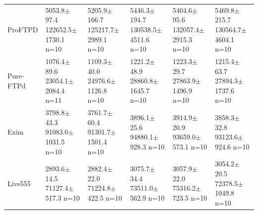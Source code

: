 \documentclass[final,5p,times,number]{elsarticle}
\begin{document}
\begin{table}[!tp]
\begin{tabularx}{\textwidth}{l *{5}{>{\centering\arraybackslash}X}}
\addlinespace[3pt]
ProFTPD & \shortstack{5053.8$\pm$97.4\\122652.5$\pm$1730.1\\n=10} & \shortstack{5205.9$\pm$166.7\\125217.7$\pm$2989.1\\n=10} & \shortstack{5446.3$\pm$194.7\\130538.5$\pm$4511.6\\n=10} & \shortstack{5404.6$\pm$95.6\\132057.4$\pm$2915.3\\n=10} & \shortstack{5469.8$\pm$215.7\\130564.7$\pm$4604.1\\n=10} \\
\addlinespace[3pt]
Pure-FTPd & \shortstack{1076.4$\pm$89.6\\23054.1$\pm$2084.4\\n=11} & \shortstack{1109.3$\pm$40.0\\24976.6$\pm$1126.8\\n=10} & \shortstack{1221.2$\pm$48.9\\28860.8$\pm$1645.7\\n=10} & \shortstack{1223.3$\pm$29.7\\27863.9$\pm$1496.9\\n=10} & \shortstack{1215.4$\pm$63.7\\27894.3$\pm$1737.6\\n=10} \\
\addlinespace[3pt]
Exim & \shortstack{3798.8$\pm$43.3\\91083.0$\pm$1031.5\\n=10} & \shortstack{3761.7$\pm$60.4\\91301.7$\pm$1501.4\\n=10} & \shortstack{3896.1$\pm$25.6\\94880.1$\pm$928.3\\n=10} & \shortstack{3914.9$\pm$20.9\\93659.0$\pm$573.1\\n=10} & \shortstack{3858.3$\pm$32.8\\93123.6$\pm$924.6\\n=10} \\
\addlinespace[3pt]
Live555 & \shortstack{2893.6$\pm$14.5\\71127.4$\pm$517.3\\n=10} & \shortstack{2882.4$\pm$22.0\\71224.8$\pm$422.5\\n=10} & \shortstack{3075.7$\pm$34.4\\73511.0$\pm$562.9\\n=10} & \shortstack{3057.9$\pm$22.0\\75316.2$\pm$723.5\\n=10} & \shortstack{3054.2$\pm$20.5\\72378.5$\pm$1049.8\\n=10} \\

\end{tabularx}
\end{table}
\end{document}

